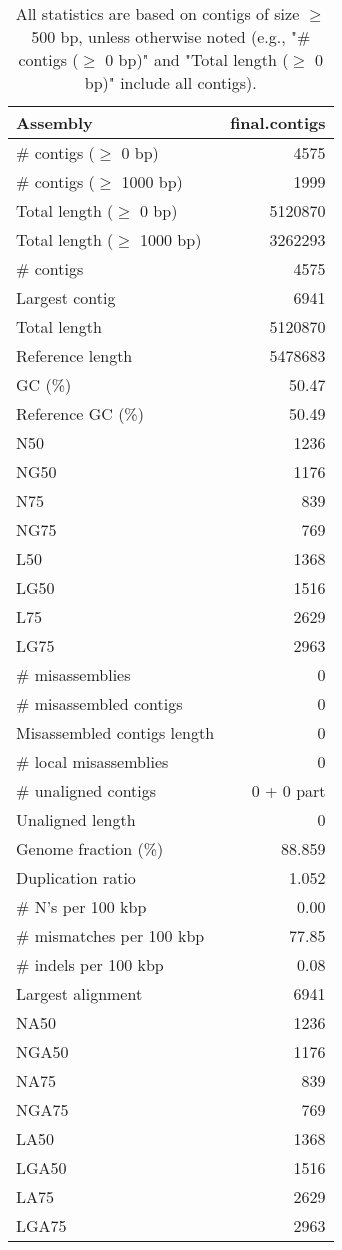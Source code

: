 \documentclass[12pt,a4paper]{article}
\begin{document}
\begin{table}[ht]
\begin{center}
\caption{All statistics are based on contigs of size $\geq$ 500 bp, unless otherwise noted (e.g., "\# contigs ($\geq$ 0 bp)" and "Total length ($\geq$ 0 bp)" include all contigs).}
\begin{tabular}{|l*{1}{|r}|}
\hline
Assembly & final.contigs \\ \hline
\# contigs ($\geq$ 0 bp) & 4575 \\ \hline
\# contigs ($\geq$ 1000 bp) & 1999 \\ \hline
Total length ($\geq$ 0 bp) & 5120870 \\ \hline
Total length ($\geq$ 1000 bp) & 3262293 \\ \hline
\# contigs & 4575 \\ \hline
Largest contig & 6941 \\ \hline
Total length & 5120870 \\ \hline
Reference length & 5478683 \\ \hline
GC (\%) & 50.47 \\ \hline
Reference GC (\%) & 50.49 \\ \hline
N50 & 1236 \\ \hline
NG50 & 1176 \\ \hline
N75 & 839 \\ \hline
NG75 & 769 \\ \hline
L50 & 1368 \\ \hline
LG50 & 1516 \\ \hline
L75 & 2629 \\ \hline
LG75 & 2963 \\ \hline
\# misassemblies & 0 \\ \hline
\# misassembled contigs & 0 \\ \hline
Misassembled contigs length & 0 \\ \hline
\# local misassemblies & 0 \\ \hline
\# unaligned contigs & 0 + 0 part \\ \hline
Unaligned length & 0 \\ \hline
Genome fraction (\%) & 88.859 \\ \hline
Duplication ratio & 1.052 \\ \hline
\# N's per 100 kbp & 0.00 \\ \hline
\# mismatches per 100 kbp & 77.85 \\ \hline
\# indels per 100 kbp & 0.08 \\ \hline
Largest alignment & 6941 \\ \hline
NA50 & 1236 \\ \hline
NGA50 & 1176 \\ \hline
NA75 & 839 \\ \hline
NGA75 & 769 \\ \hline
LA50 & 1368 \\ \hline
LGA50 & 1516 \\ \hline
LA75 & 2629 \\ \hline
LGA75 & 2963 \\ \hline
\end{tabular}
\end{center}
\end{table}
\end{document}
